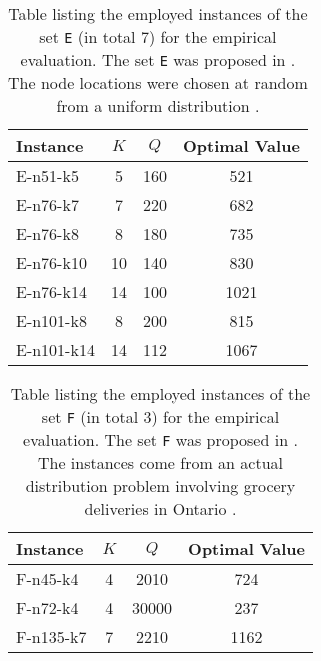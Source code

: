 \begin{table*}[thb]
	\centering
	\begin{tabular}[t]{lccc}
		\toprule
		\textbf{Instance} & $K$ & $Q$ & \textbf{Optimal Value} \\
		\midrule
		E-n51-k5          & 5   & 160 & 521                    \\
		E-n76-k7          & 7   & 220 & 682                    \\
		E-n76-k8          & 8   & 180 & 735                    \\
		E-n76-k10         & 10  & 140 & 830                    \\
		E-n76-k14         & 14  & 100 & 1021                   \\
		E-n101-k8         & 8   & 200 & 815                    \\
		E-n101-k14        & 14  & 112 & 1067                   \\
		\bottomrule
	\end{tabular}
	\caption{
		Table listing the employed instances of the set \texttt{E} (in total 7) for the empirical evaluation.
		The set \texttt{E} was proposed in \textcite{dantzig1959, christofides1969, gaskell1967bases, gillett1974heuristic}.
		The node locations were chosen at random from a uniform distribution \parencite{uchoa2017}.
	}
	\label{table:cvrp-instance-family-E}
\end{table*}

\begin{table*}[thb]
	\centering
	\begin{tabular}[t]{lccc}
		\toprule
		\textbf{Instance} & $K$ & $Q$   & \textbf{Optimal Value} \\
		\midrule
		F-n45-k4          & 4   & 2010  & 724                    \\
		F-n72-k4          & 4   & 30000 & 237                    \\
		F-n135-k7         & 7   & 2210  & 1162                   \\
		\bottomrule
	\end{tabular}
	\caption{
		Table listing the employed instances of the set \texttt{F} (in total 3) for the empirical evaluation.
		The set \texttt{F} was proposed in \textcite{fisher1994}.
		The instances come from an actual distribution problem involving grocery deliveries in Ontario \parencite{uchoa2017}.
	}
	\label{table:cvrp-instance-family-F}
\end{table*}

